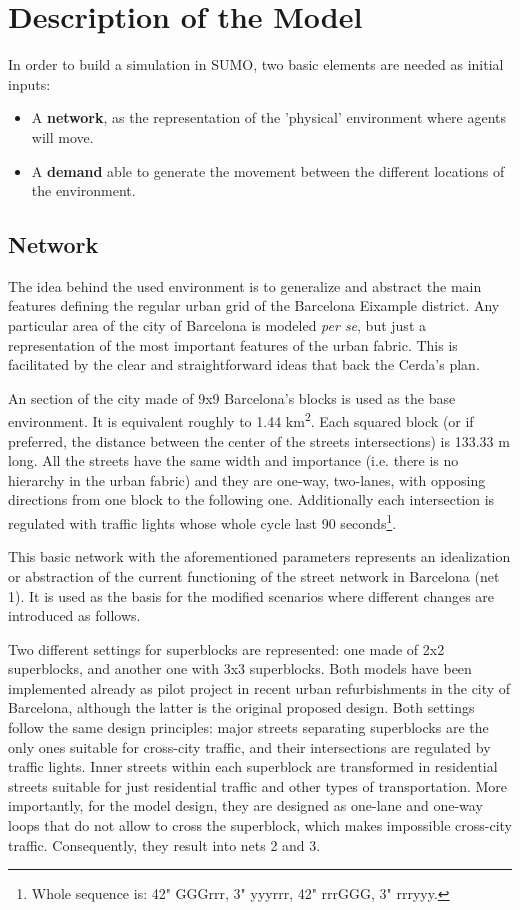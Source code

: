 \documentclass[11pt]{article}
\begin{document}
\section{Description of the Model}

In order to build a simulation in SUMO, two basic elements are needed as initial inputs:
\begin{itemize}
    \item A \textbf{network}, as the representation of the 'physical' environment where agents will move.
    \item  A \textbf{demand} able to generate the movement between the different locations of the environment.
\end{itemize}

\subsection {Network}

The idea behind the used environment is to generalize and abstract the main features defining the regular urban grid of the Barcelona Eixample district. Any particular area of the city of Barcelona is modeled \textit{per se}, but just a representation of the most important features of the urban fabric. This is facilitated by the clear and straightforward ideas that back the Cerda's plan.

An section of the city made of 9x9 Barcelona's blocks is used as the base environment. It is equivalent roughly to 1.44 km\textsuperscript{2}. Each squared block (or if preferred, the distance between the center of the streets intersections) is 133.33 m long. All the streets have the same width and importance (i.e. there is no hierarchy in the urban fabric) and they are one-way, two-lanes, with opposing directions from one block to the following one. Additionally each intersection is regulated with traffic lights whose whole cycle last 90 seconds\footnote{Whole sequence is: 42" GGGrrr, 3" yyyrrr, 42" rrrGGG, 3" rrryyy.}.

This basic network with the aforementioned parameters represents an idealization or abstraction of the current functioning of the street network in Barcelona (net 1). It is used as the basis for the modified scenarios where different changes are introduced as follows.

Two different settings for superblocks are represented: one made of 2x2 superblocks, and another one with 3x3 superblocks. Both models have been implemented already as pilot project in recent urban refurbishments in the city of Barcelona, although the latter is the original proposed design. Both settings follow the same design principles: major streets separating superblocks are the only ones suitable for cross-city traffic, and their intersections are regulated by traffic lights. Inner streets within each superblock are transformed in residential streets suitable for just residential traffic and other types of transportation. More importantly, for the model design, they are designed as one-lane and one-way loops that do not allow to cross the superblock, which makes impossible cross-city traffic. Consequently, they result into nets 2 and 3.
\end{document}
